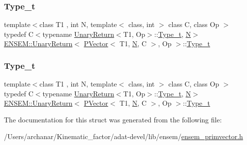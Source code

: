 \subsubsection{\texorpdfstring{Type\_t}{Type\_t}\hspace{0.1cm}{\footnotesize\ttfamily [2/3]}}
{\footnotesize\ttfamily template$<$class T1 , int N, template$<$ class, int $>$ class C, class Op $>$ \\
typedef C$<$typename \mbox{\hyperlink{structENSEM_1_1UnaryReturn}{Unary\+Return}}$<$T1, Op$>$\+::\mbox{\hyperlink{structENSEM_1_1UnaryReturn_3_01PVector_3_01T1_00_01N_00_01C_01_4_00_01Op_01_4_a4c77aefad12cfcc1bdbcc457ce10d656}{Type\+\_\+t}}, \mbox{\hyperlink{adat__devel_2lib_2hadron_2operator__name__util_8cc_a7722c8ecbb62d99aee7ce68b1752f337}{N}}$>$ \mbox{\hyperlink{structENSEM_1_1UnaryReturn}{E\+N\+S\+E\+M\+::\+Unary\+Return}}$<$ \mbox{\hyperlink{classENSEM_1_1PVector}{P\+Vector}}$<$ T1, \mbox{\hyperlink{adat__devel_2lib_2hadron_2operator__name__util_8cc_a7722c8ecbb62d99aee7ce68b1752f337}{N}}, C $>$, Op $>$\+::\mbox{\hyperlink{structENSEM_1_1UnaryReturn_3_01PVector_3_01T1_00_01N_00_01C_01_4_00_01Op_01_4_a4c77aefad12cfcc1bdbcc457ce10d656}{Type\+\_\+t}}}

\mbox{\label{structENSEM_1_1UnaryReturn_3_01PVector_3_01T1_00_01N_00_01C_01_4_00_01Op_01_4_a4c77aefad12cfcc1bdbcc457ce10d656}} 
\subsubsection{\texorpdfstring{Type\_t}{Type\_t}\hspace{0.1cm}{\footnotesize\ttfamily [3/3]}}
{\footnotesize\ttfamily template$<$class T1 , int N, template$<$ class, int $>$ class C, class Op $>$ \\
typedef C$<$typename \mbox{\hyperlink{structENSEM_1_1UnaryReturn}{Unary\+Return}}$<$T1, Op$>$\+::\mbox{\hyperlink{structENSEM_1_1UnaryReturn_3_01PVector_3_01T1_00_01N_00_01C_01_4_00_01Op_01_4_a4c77aefad12cfcc1bdbcc457ce10d656}{Type\+\_\+t}}, \mbox{\hyperlink{adat__devel_2lib_2hadron_2operator__name__util_8cc_a7722c8ecbb62d99aee7ce68b1752f337}{N}}$>$ \mbox{\hyperlink{structENSEM_1_1UnaryReturn}{E\+N\+S\+E\+M\+::\+Unary\+Return}}$<$ \mbox{\hyperlink{classENSEM_1_1PVector}{P\+Vector}}$<$ T1, \mbox{\hyperlink{adat__devel_2lib_2hadron_2operator__name__util_8cc_a7722c8ecbb62d99aee7ce68b1752f337}{N}}, C $>$, Op $>$\+::\mbox{\hyperlink{structENSEM_1_1UnaryReturn_3_01PVector_3_01T1_00_01N_00_01C_01_4_00_01Op_01_4_a4c77aefad12cfcc1bdbcc457ce10d656}{Type\+\_\+t}}}



The documentation for this struct was generated from the following file\+:\begin{DoxyCompactItemize}
\item 
/\+Users/archanar/\+Kinematic\+\_\+factor/adat-\/devel/lib/ensem/\mbox{\hyperlink{adat-devel_2lib_2ensem_2ensem__primvector_8h}{ensem\+\_\+primvector.\+h}}\end{DoxyCompactItemize}

